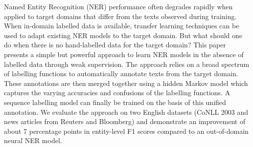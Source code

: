Named Entity Recognition (NER) performance often degrades rapidly when applied to target domains that differ from the texts observed during training. When in-domain labelled data is available, transfer learning techniques can be used to adapt existing NER models to the target domain. But what should one do when there is no hand-labelled data for the target domain? This paper presents a simple but powerful approach to learn NER models in the absence of labelled data through weak supervision. The approach relies on a broad spectrum of labelling functions to automatically annotate texts from the target domain. These annotations are then merged together using a hidden Markov model which captures the varying accuracies and confusions of the labelling functions. A sequence labelling model can finally be trained on the basis of this unified annotation. We evaluate the approach on two English datasets (CoNLL 2003 and news articles from Reuters and Bloomberg) and demonstrate an improvement of about 7 percentage points in entity-level F1 scores compared to an out-of-domain neural NER model.
